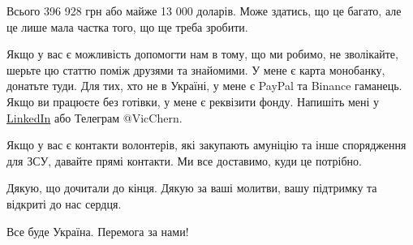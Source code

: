 Всього 396 928 грн або майже 13 000 доларів. Може здатись, що це багато, але це
лише мала частка того, що ще треба зробити.

Якщо у вас є можливість допомогти нам в тому, що ми робимо, не зволікайте,
шерьте цю статтю поміж друзями та знайомими. У мене є карта монобанку, донатьте
туди. Для тих, хто не в Україні, у мене є PayPal та Binance гаманець. Якщо ви
працюєте без готівки, у мене є реквізити фонду. Напишіть мені у
\href{https://www.linkedin.com/in/vicchern}{LinkedIn} або Телеграм @VicChern.

Якщо у вас є контакти волонтерів, які закупають амуніцію та інше спорядження
для ЗСУ, давайте прямі контакти. Ми все доставимо, куди це потрібно.

Дякую, що дочитали до кінця. Дякую за ваші молитви, вашу підтримку та відкриті
до нас сердця.

Все буде Україна. Перемога за нами!
